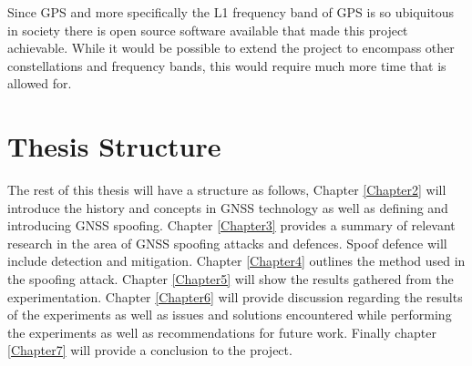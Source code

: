 Since GPS and more specifically the L1 frequency band of GPS is so ubiquitous in society there is open source software available that made this project achievable. While
it would be possible to extend the project to encompass other constellations and frequency bands, this would require much more time that is allowed for.

\section{Thesis Structure}\label{sec:structure}
The rest of this thesis will have a structure as follows, Chapter \ref{Chapter2} will introduce the history and concepts in GNSS technology as well as defining and
introducing GNSS spoofing. Chapter \ref{Chapter3} provides a summary of relevant research in the area of GNSS spoofing attacks and defences. Spoof defence will include
detection and mitigation. Chapter \ref{Chapter4} outlines the method used in the spoofing attack. Chapter \ref{Chapter5} will show the results gathered from the
experimentation. Chapter \ref{Chapter6} will provide discussion regarding the results of the experiments as well as issues and solutions encountered while performing the
experiments as well as recommendations for future work. Finally chapter \ref{Chapter7} will provide a conclusion to the project.